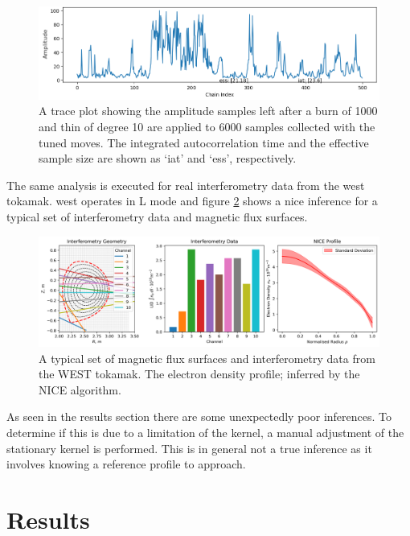 \begin{figure}[H]
    \centering
    \includegraphics[width=400pt]{images/Final/TraceBurn1000_thin10.png}
    \caption{A trace plot showing the amplitude samples left after a burn of 1000 and thin of degree 10 are applied to 6000 samples collected with the tuned moves. The integrated autocorrelation time and the effective sample size are shown as `iat' and `ess', respectively.}
    \label{fig:tracethin}
\end{figure}

The same analysis is executed for real interferometry data from the \gls{west} tokamak. \gls{west} operates in L mode and figure \ref{fig:interf_nice} shows a \gls{nice} inference for a typical set of interferometry data and magnetic flux surfaces.

\begin{figure}[H]
    \centering
    \includegraphics[width=\textwidth]{images/Final/interferometry_nice.png}
    \caption{A typical set of magnetic flux surfaces and interferometry data from the WEST tokamak. The electron density profile; inferred by the NICE algorithm.}
    \label{fig:interf_nice}
\end{figure}

As seen in the results section there are some unexpectedly poor inferences. To determine if this is due to a limitation of the kernel, a manual adjustment of the stationary kernel is performed. This is in general not a true inference as it involves knowing a reference profile to approach.

\section{Results}

